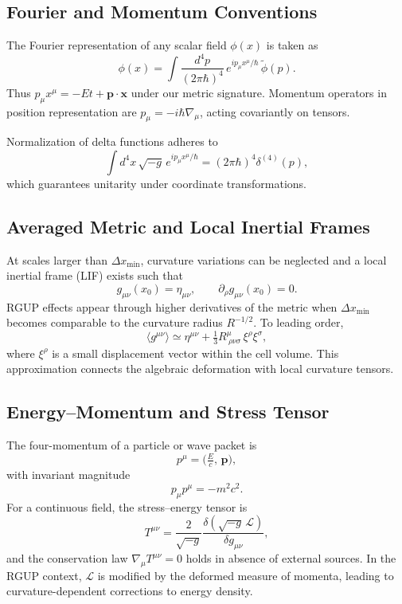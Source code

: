 \documentclass[11pt,oneside]{book}
\numberwithin{equation}{chapter}
\begin{document}
\subsection*{Fourier and Momentum Conventions}

The Fourier representation of any scalar field $\phi(x)$ is taken as
\begin{equation}
\phi(x) = 
\int \frac{d^4p}{(2\pi\hbar)^4}\,
e^{i p_\mu x^\mu / \hbar}\,
\tilde{\phi}(p).
\end{equation}
Thus $p_\mu x^\mu = -E t + \mathbf{p}\!\cdot\!\mathbf{x}$ under our metric signature.  
Momentum operators in position representation are $p_\mu = -i\hbar\nabla_\mu$, acting covariantly on tensors.

Normalization of delta functions adheres to
\begin{equation}
\int d^4x\,\sqrt{-g}\,e^{ip_\mu x^\mu/\hbar}
= (2\pi\hbar)^4\delta^{(4)}(p),
\end{equation}
which guarantees unitarity under coordinate transformations.

\subsection*{Averaged Metric and Local Inertial Frames}

At scales larger than $\Delta x_{\min}$, curvature variations can be neglected and a local inertial frame (LIF) exists such that
\begin{equation}
g_{\mu\nu}(x_0) = \eta_{\mu\nu}, \qquad
\partial_\rho g_{\mu\nu}(x_0) = 0.
\end{equation}
RGUP effects appear through higher derivatives of the metric when $\Delta x_{\min}$ becomes comparable to the curvature radius $R^{-1/2}$.  
To leading order,
\begin{equation}
\langle g^{\mu\nu}\rangle 
\simeq \eta^{\mu\nu} 
+ \tfrac{1}{3}R^{\mu}_{\ \rho\nu\sigma}\,\xi^\rho\xi^\sigma,
\end{equation}
where $\xi^\rho$ is a small displacement vector within the cell volume.  
This approximation connects the algebraic deformation with local curvature tensors.

\subsection*{Energy–Momentum and Stress Tensor}

The four-momentum of a particle or wave packet is
\begin{equation}
p^\mu = \big(\tfrac{E}{c},\,\mathbf{p}\big),
\end{equation}
with invariant magnitude
\begin{equation}
p_\mu p^\mu = -m^2 c^2.
\end{equation}
For a continuous field, the stress–energy tensor is
\begin{equation}
T^{\mu\nu}
= \frac{2}{\sqrt{-g}}
\frac{\delta(\sqrt{-g}\,\mathcal{L})}{\delta g_{\mu\nu}},
\end{equation}
and the conservation law $\nabla_\mu T^{\mu\nu}=0$ holds in absence of external sources.  
In the RGUP context, $\mathcal{L}$ is modified by the deformed measure of momenta, leading to curvature-dependent corrections to energy density.
\end{document}
